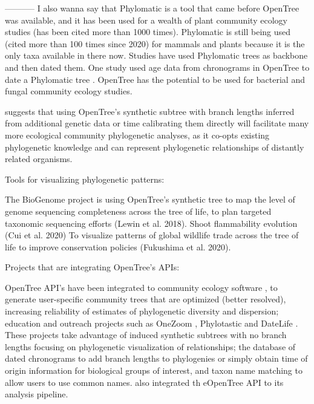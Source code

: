 \documentclass[oupdraft]{sysbio_sse}
\begin{document}
-----------
I also wanna say that Phylomatic \citep{webb2005phylomatic} is a tool that came before
OpenTree was available, and it has been used for a wealth of plant community ecology
studies (has been cited more than 1000 times).
Phylomatic is still being used (cited more than 100 times since 2020) for mammals
and plants because it is the only taxa available in there now.
Studies have used Phylomatic trees as backbone and then dated them. One study used
age data from chronograms in OpenTree to date a Phylomatic tree \citep{}.
OpenTree has the potential to be used for bacterial and fungal community ecology studies.

\citep{jantzen2019effects} suggests that using OpenTree's synthetic subtree with
branch lengths inferred from additional genetic data or time calibrating them directly
will facilitate many more ecological community phylogenetic analyses, as it co-opts existing
phylogenetic knowledge and can represent phylogenetic relationships of distantly related organisms.

Tools for visualizing phylogenetic patterns:

The BioGenome project is using OpenTree’s synthetic tree to map the level of genome
sequencing completeness across the tree of life, to plan targeted taxonomic sequencing
efforts (Lewin et al. 2018).
Shoot flammability evolution (Cui et al. 2020)
To visualize patterns of global wildlife trade across the tree of life to improve
conservation policies (Fukushima et al. 2020).

Projects that are integrating OpenTree's APIs:

OpenTree API’s have been integrated to community ecology software \citep{gastauer2018optimizing},
to generate user-specific community trees that are optimized (better resolved),
increasing reliability of estimates of phylogenetic diversity and dispersion;
education and outreach projects such as OneZoom \citep{rosindell2012onezoom, wong2020dynamic},
Phylotastic \citep{stoltzfus2013phylotastic, nguyen2020phylotastic} and DateLife
\citep{sanchez2019datelife}.
These projects take advantage of induced synthetic subtrees with no branch lengths
focusing on phylogenetic visualization of relationships; the database of dated
chronograms to add branch lengths to phylogenies or simply obtain time of origin
information for biological groups of interest, and taxon name matching to allow
users to use common names.
\citep{miller2020codonuse} also integrated th eOpenTree API to its analysis pipeline.
\end{document}
